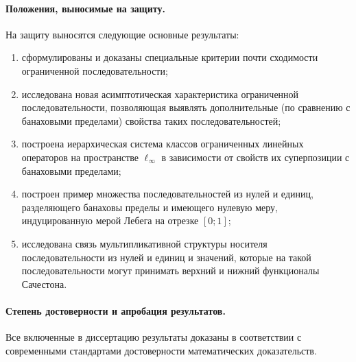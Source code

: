 \paragraph{Положения, выносимые на защиту.}
На защиту выносятся следующие основные результаты:
\begin{enumerate}
	\item
		сформулированы и доказаны специальные критерии почти сходимости
		ограниченной последовательности;
	\item
		исследована новая асимптотическая характеристика ограниченной последовательности,
		позволяющая выявлять дополнительные (по сравнению с банаховыми пределами)
		свойства таких последовательностей;
	\item
		построена иерархическая система классов ограниченных линейных операторов
		на пространстве $\ell_\infty$ в зависимости от свойств их суперпозиции с банаховыми пределами;
	\item
		построен пример множества последовательностей из нулей и единиц, разделяющего банаховы пределы
		и имеющего нулевую меру, индуцированную мерой Лебега на отрезке $[0;1]$;
	\item
		исследована связь мультипликативной структуры носителя последовательности из нулей и единиц
		и значений, которые на такой последовательности могут принимать верхний и нижний функционалы Сачестона.
\end{enumerate}



\paragraph{Степень достоверности и апробация результатов.}

Все включенные в диссертацию результаты доказаны
в соответствии с современными стандартами достоверности математических доказательств.

